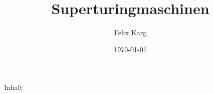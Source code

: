 \documentclass[12pt,compress,ngerman,utf8,t]{beamer}
\date{\today}
\institute{University of Freiburg}
\title{Superturingmaschinen}
\author{Felix Karg}
\begin{document}
\maketitle



\begin{frame}{Inhalt}
    \Large
    \begin{multicols}{2}
        \tableofcontents[hidesubsections]
    \end{multicols}
\end{frame}











% 




\setcounter{official}{\value{page}}

\end{document}

